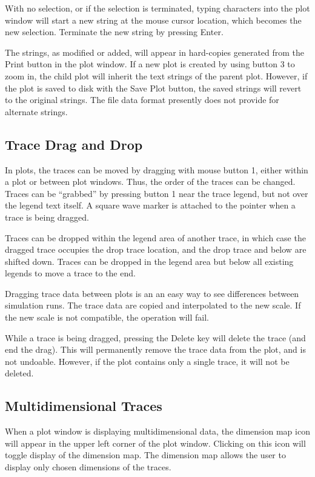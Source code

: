 With no selection, or if the selection is terminated, typing
characters into the plot window will start a new string at the mouse
cursor location, which becomes the new selection.  Terminate the new
string by pressing {\kb Enter}.

The strings, as modified or added, will appear in hard-copies
generated from the {\cb Print} button in the plot window.  If a new
plot is created by using button 3 to zoom in, the child plot will
inherit the text strings of the parent plot.  However, if the plot is
saved to disk with the {\cb Save Plot} button, the saved strings will
revert to the original strings.  The file data format presently does
not provide for alternate strings.

\subsection{Trace Drag and Drop}

In plots, the traces can be moved by dragging with mouse button 1,
either within a plot or between plot windows.  Thus, the order of the
traces can be changed.  Traces can be ``grabbed'' by pressing button 1
near the trace legend, but not over the legend text itself.  A square
wave marker is attached to the pointer when a trace is being dragged.

Traces can be dropped within the legend area of another trace, in
which case the dragged trace occupies the drop trace location, and the
drop trace and below are shifted down.  Traces can be dropped in the
legend area but below all existing legends to move a trace to the end.

Dragging trace data between plots is an an easy way to see differences
between simulation runs.  The trace data are copied and interpolated
to the new scale.  If the new scale is not compatible, the operation
will fail.

While a trace is being dragged, pressing the {\kb Delete} key will
delete the trace (and end the drag).  This will permanently remove the
trace data from the plot, and is not undoable.  However, if the plot
contains only a single trace, it will not be deleted.

\subsection{Multidimensional Traces}

When a plot window is displaying multidimensional data, the dimension
map icon will appear in the upper left corner of the plot window. 
Clicking on this icon will toggle display of the dimension map.  The
dimension map allows the user to display only chosen dimensions of the
traces.

